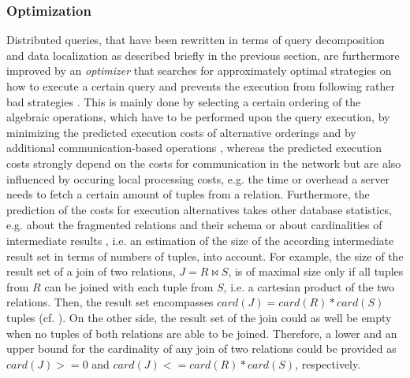 \subsubsection{Optimization}
\label{sec:theo_dqp_opt}
Distributed queries, that have been rewritten in terms of query decomposition and data localization as described briefly in the previous section, are
furthermore improved by an \emph{optimizer} that searches for approximately optimal strategies on how to execute a certain query and prevents the 
execution from following rather bad strategies \cite[p.~210]{Ozsu1991}. This is mainly done by selecting a certain ordering of the algebraic operations, 
which have to be performed upon the query execution, by minimizing the predicted execution costs of alternative orderings and by additional 
communication-based operations \cite[p.~210f.]{Ozsu1991}, whereas the predicted execution costs strongly depend on the costs for communication in the 
network but are also influenced by occuring local processing costs, e.g. the time or overhead a server needs to fetch a certain amount of tuples from a
relation. Furthermore, the prediction of the costs for execution alternatives takes other database statistics, e.g. about the fragmented relations and 
their schema or about cardinalities of intermediate results \cite[p.214ff.]{Ozsu1991}, i.e. an estimation of the size of the according intermediate result 
set in terms of numbers of tuples, into account. For example, the size of the result set of a join of two relations, $J=R \bowtie S$, is of maximal
size only if all tuples from $R$ can be joined with each tuple from $S$, i.e. a cartesian product of the two relations. Then, the result set encompasses 
$card(J)=card(R)*card(S)$ tuples (cf. \cite[p.~215]{Ozsu1991}). On the other side, the result set of the join could as well be empty when no tuples of both
relations are able to be joined. Therefore, a lower and an upper bound for the cardinality of any join of two relations could be provided as $card(J)>=0$
and $card(J)<=card(R)*card(S)$, respectively.
